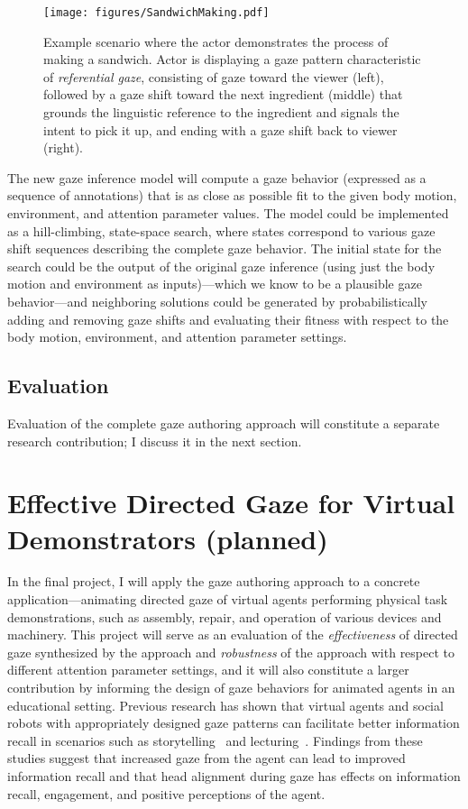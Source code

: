 \begin{figure}
\centering
\texttt{[image: figures/SandwichMaking.pdf]}
\caption{Example scenario where the actor demonstrates the process of making a sandwich. Actor is displaying a gaze pattern characteristic of \emph{referential gaze}, consisting of gaze toward the viewer (left), followed by a gaze shift toward the next ingredient (middle) that grounds the linguistic reference to the ingredient and signals the intent to pick it up, and ending with a gaze shift back to viewer (right).}
\label{fig:SandwichMaking}
\end{figure}

The new gaze inference model will compute a gaze behavior (expressed as a sequence of annotations) that is as close as possible fit to the given body motion, environment, and attention parameter values. The model could be implemented as a hill-climbing, state-space search, where states correspond to various gaze shift sequences describing the complete gaze behavior. The initial state for the search could be the output of the original gaze inference (using just the body motion and environment as inputs)---which we know to be a plausible gaze behavior---and neighboring solutions could be generated by probabilistically adding and removing gaze shifts and evaluating their fitness with respect to the body motion, environment, and attention parameter settings.

\subsection{Evaluation}

Evaluation of the complete gaze authoring approach will constitute a separate research contribution; I discuss it in the next section.

\section{Effective Directed Gaze for Virtual Demonstrators (planned)}
\label{sec:DemonstratorsGaze}

In the final project, I will apply the gaze authoring approach to a concrete application---animating directed gaze of virtual agents performing physical task demonstrations, such as assembly, repair, and operation of various devices and machinery. This project will serve as an evaluation of the \emph{effectiveness} of directed gaze synthesized by the approach and \emph{robustness} of the approach with respect to different attention parameter settings, and it will also constitute a larger contribution by informing the design of gaze behaviors for animated agents in an educational setting. Previous research has shown that virtual agents and social robots with appropriately designed gaze patterns can facilitate better information recall in scenarios such as storytelling~\citep{mutlu2006storytelling} and lecturing~\citep{andrist2012designing}. Findings from these studies suggest that increased gaze from the agent can lead to improved information recall and that head alignment during gaze has effects on information recall, engagement, and positive perceptions of the agent.

